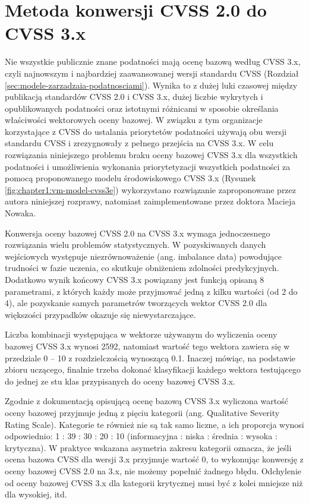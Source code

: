 \section{Metoda konwersji CVSS 2.0 do CVSS 3.x}
\label{sec:ml}
Nie wszystkie publicznie znane podatności mają ocenę bazową według CVSS 3.x, czyli najnowszym i najbardziej zaawansowanej wersji standardu CVSS (Rozdział \ref{sec:modele-zarzadzaia-podatnosciami}). Wynika to z dużej luki czasowej między publikacją standardów CVSS 2.0 i CVSS 3.x, dużej liczbie wykrytych i opublikowanych podatności oraz istotnymi różnicami w sposobie określania właściwości wektorowych oceny bazowej. W związku z tym organizacje korzystające z CVSS do ustalania priorytetów podatności używają obu wersji standardu CVSS i zrezygnowały z pełnego przejścia na CVSS 3.x. W celu rozwiązania niniejszego problemu braku oceny bazowej CVSS 3.x dla wszystkich podatności i umożliwienia wykonania priorytetyzacji wszystkich podatności za pomocą proponowanego modelu środowiskowego CVSS 3.x (Rysunek \ref{fig:chapter1:vm-model-cvss3e}) wykorzystano rozwiązanie zaproponowane przez autora niniejszej rozprawy, natomiast zaimplementowane przez doktora Macieja Nowaka. 

\bigbreak
Konwersja oceny bazowej CVSS 2.0 na CVSS 3.x wymaga jednoczesnego rozwiązania wielu problemów statystycznych. W pozyskiwanych danych wejściowych występuje niezrównoważenie (ang. imbalance data) powodujące trudności w fazie uczenia, co skutkuje obniżeniem zdolności predykcyjnych. Dodatkowo wynik końcowy CVSS 3.x powiązany jest funkcją opisaną 8 parametrami, z których każdy może przyjmować jedną z kilku wartości (od 2 do 4), ale pozyskanie samych parametrów tworzących wektor CVSS 2.0 dla większości przypadków okazuje się niewystarczające.

\bigbreak
Liczba kombinacji występująca w wektorze używanym do wyliczenia oceny bazowej CVSS 3.x wynosi 2592, natomiast wartość tego wektora zawiera się w przedziale 0 – 10 z rozdzielczością wynoszącą 0.1. Inaczej mówiąc, na podstawie zbioru uczącego, finalnie trzeba dokonać klasyfikacji każdego wektora testującego do jednej ze stu klas przypisanych do oceny bazowej CVSS 3.x.

\bigbreak
Zgodnie z dokumentacją opisującą ocenę bazową CVSS 3.x wyliczona wartość oceny bazowej przyjmuje jedną z pięciu kategorii (ang. Qualitative Severity Rating Scale). Kategorie te również nie są tak samo liczne, a ich proporcja wynosi odpowiednio: 1 : 39 : 30 : 20 : 10 (informacyjna : niska : średnia : wysoka : krytyczna).  W praktyce wskazana asymetria zakresu kategorii oznacza, że jeśli ocena bazowa CVSS dla wersji 3.x przyjmuje wartość 0, to wykonując konwersję z oceny bazowej CVSS 2.0 na 3.x, nie możemy popełnić żadnego błędu. Odchylenie od oceny bazowej CVSS 3.x dla kategorii krytycznej musi być z kolei mniejsze niż dla wysokiej, itd. 

